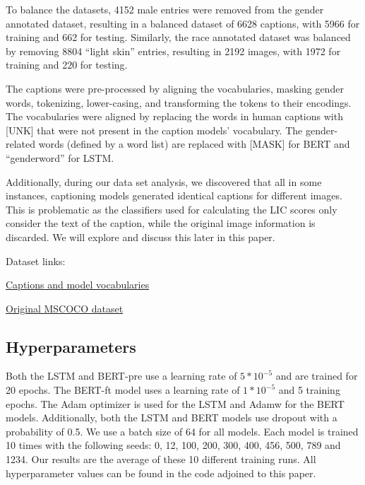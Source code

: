 To balance the datasets, 4152 male entries were removed from the gender annotated dataset, resulting in a balanced dataset of 6628 captions, with 5966 for training and 662 for testing. Similarly, the race annotated dataset was balanced by removing 8804 “light skin” entries, resulting in 2192 images, with 1972 for training and 220 for testing. \newline

The captions were pre-processed by aligning the vocabularies, masking gender words, tokenizing, lower-casing, and transforming the tokens to their encodings. The vocabularies were aligned by replacing the words in human captions with [UNK] that were not present in the caption models’ vocabulary. The gender-related words (defined by a word list) are replaced with [MASK] for BERT and “genderword” for LSTM. \newline

Additionally, during our data set analysis, we discovered that all in some instances, captioning models generated identical captions for different images. This is problematic as the classifiers used for calculating the LIC scores only consider the text of the caption, while the original image information is discarded. We will explore and discuss this later in this paper. \newline


Dataset links:

\href{https://drive.google.com/drive/folders/1PI03BqcnhdXZi2QY9PUHzWn4cxgdonT-}{Captions and model vocabularies}



\href{https://cocodataset.org/#download}{Original MSCOCO dataset}

\subsection{Hyperparameters}

Both the LSTM and BERT-pre use a learning rate of $5*10^{-5}$ and are 
trained for 20 epochs. The BERT-ft model uses a learning rate of 
$1*10^{-5}$ and 5 training epochs. The Adam optimizer is used for the 
LSTM and Adamw for the BERT models. Additionally, both the LSTM and 
BERT models use dropout with a probability of 0.5. We use a batch size of 64 
for all models. Each model is 
trained 10 times with the following seeds: 0, 12, 100, 200, 300, 400, 
456, 500, 789 and 1234. Our results are the average of these 10 
different training runs. All hyperparameter values can be found in the code 
adjoined to this paper.

